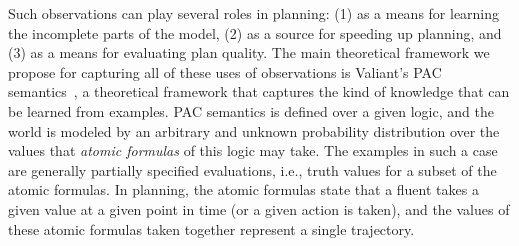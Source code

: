 \documentclass[12pt]{article}
\begin{document}
Such observations can play several roles in planning: (1) as a means for learning the incomplete parts of the model, (2) as a source for speeding up planning, and (3) as a means for evaluating plan quality. 
The main theoretical framework we propose for capturing all of these uses of observations is Valiant's PAC semantics~\cite{valiant2000robustLogics}, a theoretical framework that captures the kind of knowledge that can be learned from examples. 
PAC semantics is defined over a given logic, and 
the world is modeled by an arbitrary and unknown probability distribution over the values that {\em atomic formulas} of this logic may take. The examples in such a case are generally partially specified evaluations, i.e., truth values for a subset of the atomic formulas. In planning, the atomic formulas state that a fluent takes a given value at a given point in time (or a given action is taken), and the values of these atomic formulas taken together represent a single trajectory.

\end{document}
